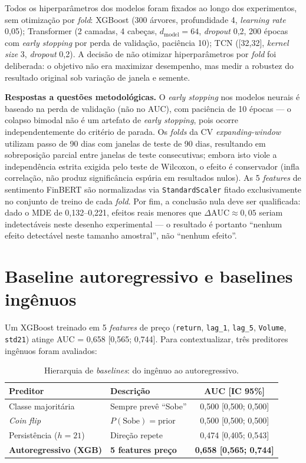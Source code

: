 \documentclass[
    12pt,
    openright,
    oneside,
    a4paper,
    english,
    brazil
]{abntex2}
\begin{document}
Todos os hiperparâmetros dos modelos foram fixados ao longo dos experimentos, sem otimização por \textit{fold}: XGBoost (300 árvores, profundidade 4, \textit{learning rate} 0,05); Transformer (2 camadas, 4 cabeças, $d_\text{model}=64$, \textit{dropout} 0,2, 200 épocas com \textit{early stopping} por perda de validação, paciência 10); TCN ([32,32], \textit{kernel size} 3, \textit{dropout} 0,2). A decisão de não otimizar hiperparâmetros por \textit{fold} foi deliberada: o objetivo não era maximizar desempenho, mas medir a robustez do resultado original sob variação de janela e semente.

\textbf{Respostas a questões metodológicas.} O \textit{early stopping} nos modelos neurais é baseado na perda de validação (não no AUC), com paciência de 10 épocas --- o colapso bimodal não é um artefato de \textit{early stopping}, pois ocorre independentemente do critério de parada. Os \textit{folds} da CV \textit{expanding-window} utilizam passo de 90 dias com janelas de teste de 90 dias, resultando em sobreposição parcial entre janelas de teste consecutivas; embora isto viole a independência estrita exigida pelo teste de Wilcoxon, o efeito é conservador (infla correlação, não produz significância espúria em resultados nulos). As 5 \textit{features} de sentimento FinBERT são normalizadas via \texttt{StandardScaler} fitado exclusivamente no conjunto de treino de cada \textit{fold}. Por fim, a conclusão nula deve ser qualificada: dado o MDE de 0,132--0,221, efeitos reais menores que $\Delta \text{AUC} \approx 0{,}05$ seriam indetectáveis neste desenho experimental --- o resultado é portanto ``nenhum efeito detectável neste tamanho amostral'', não ``nenhum efeito''.

\section{Baseline autoregressivo e baselines ingênuos}

Um XGBoost \cite{chen2016} treinado em 5 \textit{features} de preço (\texttt{return}, \texttt{lag\_1}, \texttt{lag\_5}, \texttt{Volume}, \texttt{std21}) atinge AUC = 0,658 [0,565; 0,744]. Para contextualizar, três preditores ingênuos foram avaliados:

\begin{table}[htb]
\centering
\caption{Hierarquia de \textit{baselines}: do ingênuo ao autoregressivo.}\label{tab:naive}
\begin{tabular}{llc}
\toprule
\textbf{Preditor} & \textbf{Descrição} & \textbf{AUC [IC 95\%]} \\
\midrule
Classe majoritária     & Sempre prevê ``Sobe''           & 0,500 [0,500; 0,500] \\
\textit{Coin flip}     & $P(\text{Sobe}) = \text{prior}$ & 0,500 [0,500; 0,500] \\
Persistência ($h=21$)  & Direção repete                  & 0,474 [0,405; 0,543] \\
\textbf{Autoregressivo (XGB)} & \textbf{5 features preço} & \textbf{0,658 [0,565; 0,744]} \\
\bottomrule
\end{tabular}
\end{table}
\end{document}
